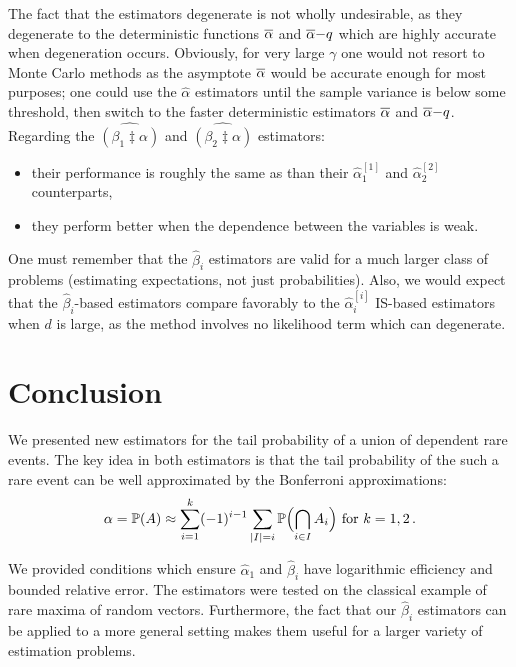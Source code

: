 The fact that the estimators degenerate is not wholly undesirable, as they degenerate to the deterministic functions $\overline{\alpha}$ and $\overline{\alpha}{-}q$ which are highly accurate when degeneration occurs. Obviously, for very large $\gamma$ one would not resort to Monte Carlo methods as the asymptote $\overline{\alpha}$ would be accurate enough for most purposes; one could use the $\hat{\alpha}$ estimators until the sample variance is below some threshold, then switch to the faster deterministic estimators $\overline{\alpha}$ and $\overline{\alpha}{-}q$. \\

\noindent
Regarding the $\widehat{(\beta_1 \ddagger \alpha)}$ and $\widehat{(\beta_2 \ddagger \alpha)}$ estimators:
\begin{itemize}
\item their performance is roughly the same as than their $\hat{\alpha}_1^{[1]}$ and $\hat{\alpha}_2^{[2]}$ counterparts,
\item they perform better when the dependence between the variables is weak.
\end{itemize}
One must remember that the $\hat{\beta}_i$ estimators are valid for a much larger class of problems (estimating expectations, not just probabilities). Also, we would expect that the $\hat{\beta}_i$-based estimators compare favorably to the $\hat{\alpha}_i^{[i]}$ IS-based estimators when $d$ is large, as the method involves no likelihood term which can degenerate.



\section{Conclusion}

We presented new estimators for the tail probability of a union of dependent rare events.
The key idea in both estimators is that the tail probability of the such a rare event can be
well approximated by the Bonferroni approximations:
\begin{align*}
  \alpha = \operatorname{{\mathbb P}}(A) \approx \sum_{i=1}^k (-1)^{i-1} \sum_{\lvert I\rvert= i} \operatorname{{\mathbb P}}\Bigl(\bigcap_{i\in I}A_i\Bigr) \text{ for } k=1,2\,.
\end{align*}

We provided conditions which ensure $\hat{\alpha}_1$ and $\hat{\beta}_i$ have logarithmic efficiency and bounded relative error.
The estimators were tested on the classical example of rare maxima of random vectors.
Furthermore, the fact that our $\hat{\beta}_i$ estimators can be applied
to a more general setting makes them useful for a larger variety of estimation problems.

